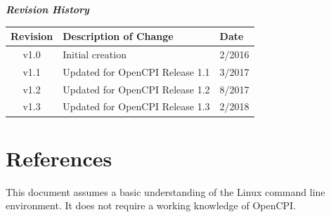         \begin{center}
        \textit{\textbf{Revision History}}
                \begin{table}[H]
                \label{table:revisions} %
                        \begin{tabularx}{\textwidth}{|c|X|l|}
                        \hline
                        \rowcolor{blue}
                        \textbf{Revision} & \textbf{Description of Change} & \textbf{Date} \\
                        \hline
                        v1.0 & Initial creation & 2/2016 \\
                        \hline
                        v1.1 & Updated for OpenCPI Release 1.1 & 3/2017 \\
			            \hline
                        v1.2 & Updated for OpenCPI Release 1.2 & 8/2017 \\
                        \hline
                        v1.3 & Updated for OpenCPI Release 1.3 & 2/2018 \\
                        \hline
                        \end{tabularx}
                \end{table}
        \end{center}

\newpage

\tableofcontents

\newpage

\listoffigures

\newpage

\listoftables

\newpage

\section{References}

This document assumes a basic understanding of the Linux command line environment. It does not require a working knowledge of OpenCPI.
\def\refskipgs{} %
\def\myreferences{
\hline
Component Development Guide & OpenCPI & \url{https://goo.gl/zBwIe0} \\
\hline
RCC Development Guide & OpenCPI & \url{https://goo.gl/0ix1E0} \\
\hline
HDL Development Guide & OpenCPI & \url{https://goo.gl/OVmRhI} \\
}


